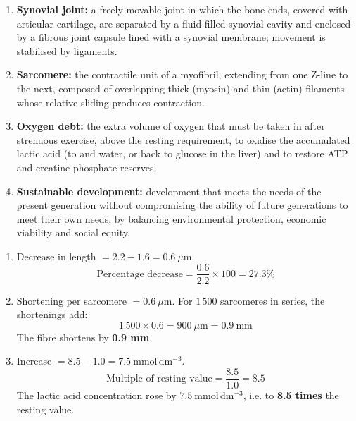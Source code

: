 \documentclass[11pt]{article}
\begin{document}
\begin{corrige}
\begin{enumerate}
\item \textbf{Synovial joint:} a freely movable joint in which the bone ends, covered with articular cartilage, are separated by a fluid-filled synovial cavity and enclosed by a fibrous joint capsule lined with a synovial membrane; movement is stabilised by ligaments.
\item \textbf{Sarcomere:} the contractile unit of a myofibril, extending from one Z-line to the next, composed of overlapping thick (myosin) and thin (actin) filaments whose relative sliding produces contraction.
\item \textbf{Oxygen debt:} the extra volume of oxygen that must be taken in after strenuous exercise, above the resting requirement, to oxidise the accumulated lactic acid (to  and water, or back to glucose in the liver) and to restore ATP and creatine phosphate reserves.
\item \textbf{Sustainable development:} development that meets the needs of the present generation without compromising the ability of future generations to meet their own needs, by balancing environmental protection, economic viability and social equity.
\end{enumerate}
\end{corrige}

\begin{corrige}
\begin{enumerate}
\item Decrease in length $= 2.2 - 1.6 = 0.6\ \mu\mathrm{m}$.
\[ \text{Percentage decrease} = \frac{0.6}{2.2}\times 100 = 27.3\% \]
\item Shortening per sarcomere $= 0.6\ \mu\mathrm{m}$. For $1\,500$ sarcomeres in series, the shortenings add:
\[ 1\,500 \times 0.6 = 900\ \mu\mathrm{m} = 0.9\ \mathrm{mm} \]
The fibre shortens by \textbf{0.9 mm}.
\item Increase $= 8.5 - 1.0 = 7.5\ \mathrm{mmol\,dm^{-3}}$.
\[ \text{Multiple of resting value} = \frac{8.5}{1.0} = 8.5 \]
The lactic acid concentration rose by $7.5\ \mathrm{mmol\,dm^{-3}}$, i.e. to \textbf{8.5 times} the resting value.
\end{enumerate}
\end{corrige}
\end{document}
